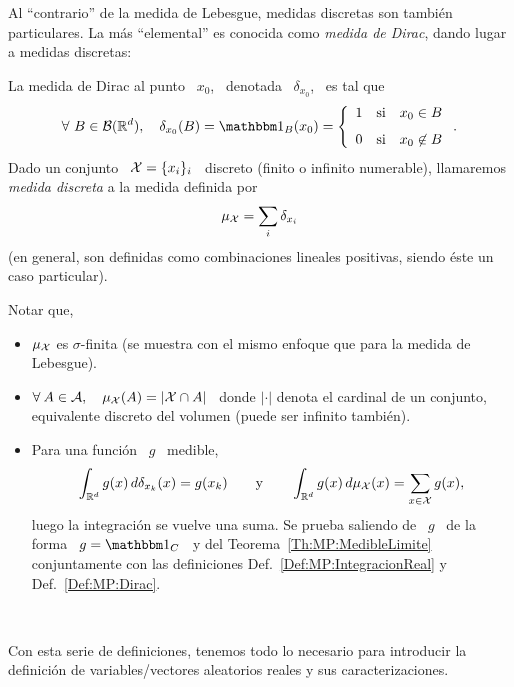 Al  ``contrario'' de  la medida  de  Lebesgue, medidas  discretas son  tambi\'en
particulares. La  m\'as ``elemental''  es conocida como  {\it medida  de Dirac},
dando lugar a medidas discretas:
%
\begin{definicion}\label{Def:MP:Dirac}
  La medida de Dirac al punto \ $x_0$, \ denotada \ $\delta_{x_0}$, \ es tal que
  \[
  \forall   \  B  \in   \B(\Rset^d),  \quad   \delta_{x_0}(B)  =   \un_B(x_0)  =
  \left\{ \begin{array}{ccc}
  1 & \mbox{si} & x_0 \in B\\[2.5mm]
  0 & \mbox{si} & x_0 \not\in B
  \end{array}\right..
  \]
  Dado un conjunto \ $\mathcal{X} = \{  x_i \}_i$ \ discreto (finito o infinito numerable),
  llamaremos {\it medida discreta} a la medida definida por
  \[
  \mu_{\mathcal{X}} = \sum_i \delta_{x_i}
  \]
  (en  general,  son definidas  como  combinaciones  lineales positivas,  siendo
  \'este un caso particular).
\end{definicion}
%
Notar que,
%
\begin{itemize}
%
\item $\mu_{\mathcal{X}}$ es  $\sigma$-finita (se muestra con el mismo  enfoque que para la
  medida de Lebesgue).
%
\item $\forall  \: A \in \mathcal{A},  \quad \mu_{\mathcal{X}}(A) =  |\mathcal{X} \cap A|$ \  donde $|\cdot|$
  denota el cardinal de un conjunto, equivalente discreto del volumen (puede ser
  infinito tambi\'en).
%
\item Para una funci\'on \ $g$ \ medible,
  \[
  \int_{\mathbb{R}^d} g(x) \, d\delta_{x_k}(x) = g(x_k) \qquad \mbox{y} \qquad
  \int_{\mathbb{R}^d} g(x) \, d\mu_{\mathcal{X}}(x) = \sum_{x \in \mathcal{X}} g(x),
  \]
  luego la integraci\'on se  vuelve una suma.  Se prueba saliendo de  \ $g$ \ de
  la forma \ $g = \un_C$ \ y del Teorema~\ref{Th:MP:MedibleLimite} conjuntamente
  con       las      definiciones       Def.~\ref{Def:MP:IntegracionReal}      y
  Def.~\ref{Def:MP:Dirac}.
\end{itemize}

\

Con esta  serie de  definiciones, tenemos todo  lo necesario para  introducir la
definici\'on de variables/vectores aleatorios reales y sus caracterizaciones.



\label{Ssec:MP:VAGeneral}


